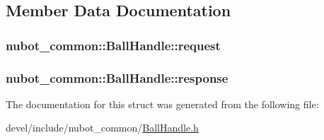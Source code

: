 \subsection{Member Data Documentation}
\hypertarget{structnubot__common_1_1BallHandle_ad7035cd66ffcd868080ea27b5a37f5fd}{
\subsubsection[{request}]{ nubot\-\_\-common\-::\-Ball\-Handle\-::request}}\label{structnubot__common_1_1BallHandle_ad7035cd66ffcd868080ea27b5a37f5fd}
\hypertarget{structnubot__common_1_1BallHandle_acbc867111f0d45b35e263dd048e86a24}{
\subsubsection[{response}]{ nubot\-\_\-common\-::\-Ball\-Handle\-::response}}\label{structnubot__common_1_1BallHandle_acbc867111f0d45b35e263dd048e86a24}


The documentation for this struct was generated from the following file\-:\begin{DoxyCompactItemize}
\item 
devel/include/nubot\-\_\-common/\hyperlink{BallHandle_8h}{Ball\-Handle.\-h}\end{DoxyCompactItemize}
